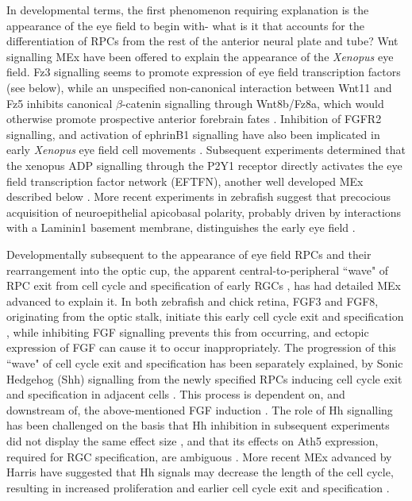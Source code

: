 In developmental terms, the first phenomenon requiring explanation is the appearance of the eye field to begin with- what is it that accounts for the differentiation of RPCs from the rest of the anterior neural plate and tube? Wnt signalling MEx have been offered to explain the appearance of the \textit{Xenopus} eye field. Fz3 signalling seems to promote expression of eye field transcription factors (see below)\cite{Rasmussen2001}, while an unspecified non-canonical interaction between Wnt11 and Fz5 inhibits canonical $\beta$-catenin signalling through Wnt8b/Fz8a, which would otherwise promote prospective anterior forebrain fates \cite{Cavodeassi2005}. Inhibition of FGFR2 signalling, and activation of ephrinB1 signalling have also been implicated in early \textit{Xenopus} eye field cell movements \cite{Moore2004}. Subsequent experiments determined that the xenopus ADP signalling through the P2Y1 receptor directly activates the eye field transcription factor network (EFTFN), another well developed MEx described below \cite{Masse2007}. More recent experiments in zebrafish suggest that precocious acquisition of neuroepithelial apicobasal polarity, probably driven by interactions with a Laminin1 basement membrane, distinguishes the early eye field \cite{Ivanovitch2013}.

Developmentally subsequent to the appearance of eye field RPCs and their rearrangement into the optic cup, the apparent central-to-peripheral ``wave" of RPC exit from cell cycle and specification of early RGCs \cite{Hu1999}, has had detailed MEx advanced to explain it. In both zebrafish and chick retina, FGF3 and FGF8, originating from the optic stalk, initiate this early cell cycle exit and specification \cite{Martinez-Morales2005}, while inhibiting FGF signalling prevents this from occurring, and ectopic expression of FGF can cause it to occur inappropriately. The progression of this ``wave" of cell cycle exit and specification has been separately explained, by Sonic Hedgehog (Shh) signalling from the newly specified RPCs inducing cell cycle exit and specification in adjacent cells \cite{Neumann2000}. This process is dependent on, and downstream of, the above-mentioned FGF induction \cite{Martinez-Morales2005}. The role of Hh signalling has been challenged on the basis that Hh inhibition in subsequent experiments did not display the same effect size \cite{Stenkamp2003}, and that its effects on Ath5 expression, required for RGC specification, are ambiguous \cite{Agathocleous2009}. More recent MEx advanced by Harris have suggested that Hh signals may decrease the length of the cell cycle, resulting in increased proliferation and earlier cell cycle exit and specification \cite{Locker2006, Agathocleous2007}.

